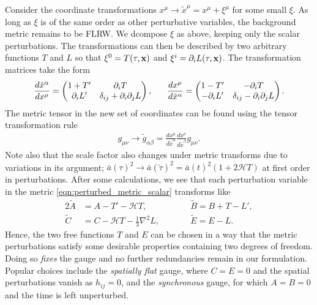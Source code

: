 Consider the coordinate transformations $x^\mu \rightarrow \tilde{x}^\mu = x^\mu + \xi^\mu$ for some small $\xi$. As long as $\xi$ is of the same order as other perturbative variables, the background metric remains to be FLRW. We dcompose $\xi$ as above, keeping only the scalar perturbations. The transformations can then be described by two arbitrary functions $T$ and $L$ so that $\xi^0 = T(\tau,\mathbf{x})$ and $\xi^i = \partial_i L(\tau,\mathbf{x})$. The transformation matrices take the form
\begin{align}
	\frac{d\tilde{x}^\alpha}{dx^\mu} = \begin{pmatrix}
		1 + T' & \partial_i T \\ \partial_i L' & \delta_{ij} + \partial_i \partial_j L
	\end{pmatrix},
	\hspace{0.05\linewidth}
	\frac{dx^\mu}{d\tilde{x}^\alpha} = \begin{pmatrix}
		1 - T' & -\partial_i T \\ -\partial_i L' & \delta_{ij} - \partial_i \partial_j L
	\end{pmatrix}. \label{eqn:gauge_transformation_matrix}
\end{align}
The metric tensor in the new set of coordinates can be found using the tensor transformation rule
\begin{align}
	g_{\mu\nu} \rightarrow \tilde{g}_{\alpha\beta} = \frac{dx^\mu}{d\tilde{x}^\alpha} \frac{dx^\nu}{d\tilde{x}^\beta} g_{\mu\nu}.
\end{align}
Note also that the scale factor also changes under 
metric transforms due to variations in its argument;  $\bar{a}(\tau)^2 \rightarrow \bar{a}(\tilde{\tau})^2 = \bar{a}(t)^2 (1 + 2 \mathcal{H} T)$ at first order in perturbations. After some calculations, we see that each perturbation variable in the metric \eqref{eqn:perturbed_metric_scalar} transforms like
\begin{alignat}{2}
	\tilde{A} &= A - T' - \mathcal{H}T, \qquad &&\tilde{B} = B + T - L', \label{eqn:gauge_transform_perturbations_1}\\
	\tilde{C} &= C - \mathcal{H}T - \frac{1}{3}\nabla^2 L, \qquad &&\tilde{E} = E - L. \label{eqn:gauge_transform_perturbations_2}
\end{alignat}
Hence, the two free functions $T$ and $E$ can be chosen in a way that the metric perturbations satisfy some desirable properties containing two degrees of freedom. Doing so \textit{fixes} the gauge and no further redundancies remain in our formulation. Popular choices include the \textit{spatially flat} gauge, where $C=E=0$ and the spatial perturbations vanish as $h_{ij}=0$, and the \textit{synchronous} gauge, for which $A=B=0$ and the time is left unperturbed.

